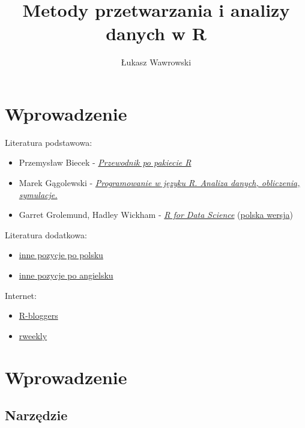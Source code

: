 \documentclass[]{book}
\title{Metody przetwarzania i analizy danych w R}
\author{Łukasz Wawrowski}
\date{}
\providecommand{\tightlist}{%
  \setlength{\itemsep}{0pt}\setlength{\parskip}{0pt}}
\begin{document}
\maketitle

{
\setcounter{tocdepth}{1}
\tableofcontents
}
\chapter*{Wprowadzenie}\label{wprowadzenie}

Literatura podstawowa:

\begin{itemize}
\tightlist
\item
  Przemysław Biecek -
  \href{http://pbiecek.github.io/Przewodnik/}{\emph{Przewodnik po
  pakiecie R}}
\item
  Marek Gągolewski -
  \href{http://www.gagolewski.com/publications/programowanier/}{\emph{Programowanie
  w języku R. Analiza danych, obliczenia, symulacje.}}
\item
  Garret Grolemund, Hadley Wickham -
  \href{http://r4ds.had.co.nz/}{\emph{R for Data Science}}
  (\href{https://helion.pl/ksiazki/jezyk-r-kompletny-zestaw-narzedzi-dla-analitykow-danych-hadley-wickham-garrett-grolemund,jezrko.htm}{polska
  wersja})
\end{itemize}

Literatura dodatkowa:

\begin{itemize}
\tightlist
\item
  \href{https://github.com/mi2-warsaw/SER/blob/master/histoRia/README.md}{inne
  pozycje po polsku}
\item
  \href{https://bookdown.org/}{inne pozycje po angielsku}
\end{itemize}

Internet:

\begin{itemize}
\tightlist
\item
  \href{https://www.r-bloggers.com/}{R-bloggers}
\item
  \href{https://rweekly.org/}{rweekly}
\end{itemize}

\chapter{Wprowadzenie}\label{wprowadzenie-1}

\section{Narzędzie}\label{narzedzie}
\end{document}
